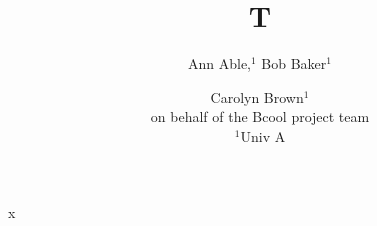 \documentclass{article}
\begin{document}
\title{T}
\author{Ann Able,$^1$ Bob Baker$^1$ \and Carolyn Brown$^1$\\
{\footnotesize on behalf of the Bcool project team}\\ $^1$Univ A}
\maketitle
x
\end{document}
